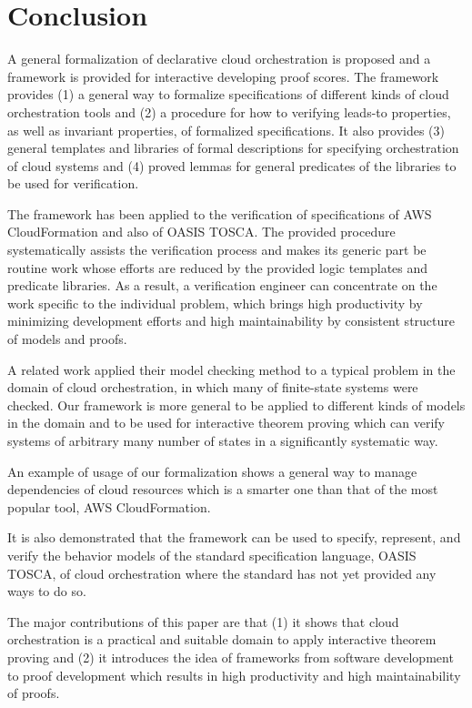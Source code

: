 \documentclass[12pt]{report}
\begin{document}
\section{Conclusion}
A general formalization of declarative cloud orchestration is proposed
and a framework is provided for interactive developing proof
scores. The framework provides (1) a general way to formalize
specifications of different kinds of cloud orchestration tools and (2)
a procedure for how to verifying leads-to properties, as well as
invariant properties, of formalized specifications.  It also provides
(3) general templates and libraries of formal descriptions for
specifying orchestration of cloud systems and (4) proved lemmas for
general predicates of the libraries to be used for verification.

The framework has been applied to the verification of specifications
of AWS CloudFormation and also of OASIS TOSCA. The provided procedure
systematically assists the verification process and makes its generic
part be routine work whose efforts are reduced by the provided logic
templates and predicate libraries. As a result, a verification
engineer can concentrate on the work specific to the individual
problem, which brings high productivity by minimizing development
efforts and high maintainability by consistent structure of models and
proofs.

A related work applied their model checking method to a typical
problem in the domain of cloud orchestration, in which many of
finite-state systems were checked. Our framework is more general to be
applied to different kinds of models in the domain and to be used for
interactive theorem proving which can verify systems of arbitrary many
number of states in a significantly systematic way.

An example of usage of our formalization shows a general way to manage
dependencies of cloud resources which is a smarter one than that of
the most popular tool, AWS CloudFormation.

It is also demonstrated that the framework can be used to specify,
represent, and verify the behavior models of the standard
specification language, OASIS TOSCA, of cloud orchestration where the
standard has not yet provided any ways to do so.

The major contributions of this paper are that (1) it shows that cloud
orchestration is a practical and suitable domain to apply interactive
theorem proving and (2) it introduces the idea of frameworks from
software development to proof development which results in high
productivity and high maintainability of proofs.
\end{document}
